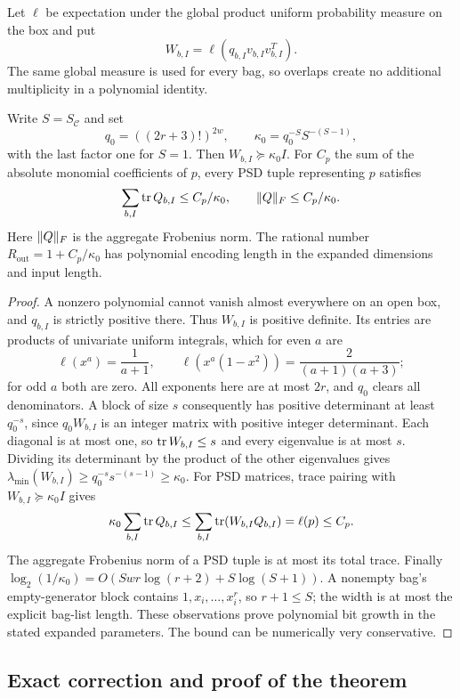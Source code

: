 Let $\ell$ be expectation under the global product uniform probability
measure on the box and put
\[
 W_{b,I}=\ell(q_{b,I}v_{b,I}v_{b,I}^{T}).
\]
The same global measure is used for every bag, so overlaps create no
additional multiplicity in a polynomial identity.

\begin{lemma}\label{lem:rat-outer}
Write $S=S_{\mathcal C}$ and set
\[
 q_0=((2r+3)!)^{2w},\qquad
 \kappa_0=q_0^{-S}S^{-(S-1)},
\]
with the last factor one for $S=1$. Then $W_{b,I}\succeq\kappa_0 I$.
For $C_p$ the sum of the absolute monomial coefficients of $p$, every
PSD tuple representing $p$ satisfies
\begin{equation}\label{eq:rat-outer}
 \sum_{b,I}\operatorname{tr} Q_{b,I}\le C_p/\kappa_0,
 \qquad \lVert Q\rVert_F\le C_p/\kappa_0.
\end{equation}
Here $\lVert Q\rVert_F$ is the aggregate Frobenius norm. The rational number
$R_{\mathrm{out}}=1+C_p/\kappa_0$ has polynomial encoding length in the
expanded dimensions and input length.
\end{lemma}
\begin{proof}
A nonzero polynomial cannot vanish almost everywhere on an open box, and
$q_{b,I}$ is strictly positive there. Thus $W_{b,I}$ is positive definite.
Its entries are products of univariate uniform integrals, which for even
$a$ are
\[
 \ell(x^a)=\frac1{a+1},\qquad
 \ell(x^a(1-x^2))=\frac2{(a+1)(a+3)};
\]
for odd $a$ both are zero. All exponents here are at most $2r$, and $q_0$
clears all denominators. A block of size $s$ consequently has positive
determinant at least $q_0^{-s}$, since $q_0W_{b,I}$ is an integer matrix
with positive integer determinant. Each diagonal is at most one, so
$\operatorname{tr} W_{b,I}\le s$ and every eigenvalue is at most $s$. Dividing its
determinant by the product of the other eigenvalues gives
$\lambda_{\min}(W_{b,I})\ge q_0^{-s}s^{-(s-1)}\ge\kappa_0$.
For PSD matrices, trace pairing with $W_{b,I}\succeq\kappa_0 I$ gives
\[
 \kappa_0\sum_{b,I}\operatorname{tr} Q_{b,I}
 \le\sum_{b,I}\operatorname{tr}(W_{b,I}Q_{b,I})
 =\ell(p)\le C_p.
\]
The aggregate Frobenius norm of a PSD tuple is at most its total trace.
Finally
$\log_2(1/\kappa_0)=O(Swr\log(r+2)+S\log(S+1))$.
A nonempty bag's empty-generator block contains $1,x_i,\ldots,x_i^r$,
so $r+1\le S$; the width is at most the explicit bag-list length.
These observations prove polynomial bit growth in the stated expanded
parameters. The bound can be numerically very conservative.
\end{proof}

\subsection{Exact correction and proof of the theorem}\label{sec:rat-correction}

